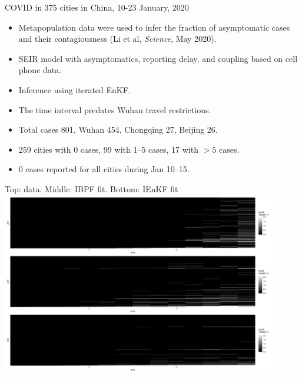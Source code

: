 \documentclass{beamer}
\begin{document}

\begin{frame}{COVID in 375 cities in China, 10-23 January, 2020}

  \begin{itemize}
  \item Metapopulation data were used to infer the fraction of asymptomatic cases and their contagiousness
    (Li et al, {\it Science}, May 2020).
  \item SEIR model with asymptomatics, reporting delay, and coupling based on cell phone data.
  \item Inference using iterated EnKF.

    \vspace{5mm}
   \item
    The time interval predates Wuhan travel restrictions.
   \item Total cases 801, Wuhan 454, Chongqing 27, Beijing 26.
   \item{} 259 cities with 0 cases, 99 with 1--5 cases, 17 with $>5$ cases.
   \item{} 0 cases reported for all cities during Jan 10--15.

\end{itemize}     

\end{frame}

\begin{frame}{Top: data. Middle: IBPF fit. Bottom: IEnKF fit} 
\includegraphics[width=12cm]{covid/3-panel.pdf}
\end{frame}
\end{document}
